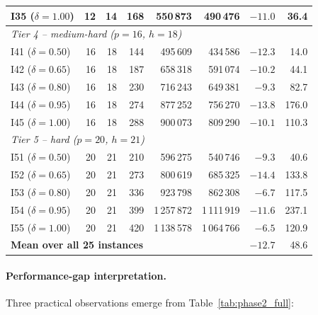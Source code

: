 \begin{table}[t]
{\begin{tabular}{@{}lrrrrrrr@{}}
I35 ($\delta=1.00$) & 12 & 14 & 168 & 550\,873 & 490\,476 & $-11.0$ &  36.4 \\
\midrule
\multicolumn{8}{l}{\emph{Tier 4 -- medium-hard ($p=16$, $h=18$)}} \\
I41 ($\delta=0.50$) & 16 & 18 & 144 & 495\,609 & 434\,586 & $-12.3$ &  14.0 \\
I42 ($\delta=0.65$) & 16 & 18 & 187 & 658\,318 & 591\,074 & $-10.2$ &  44.1 \\
I43 ($\delta=0.80$) & 16 & 18 & 230 & 716\,243 & 649\,381 &  $-9.3$ &  82.7 \\
I44 ($\delta=0.95$) & 16 & 18 & 274 & 877\,252 & 756\,270 & $-13.8$ & 176.0 \\
I45 ($\delta=1.00$) & 16 & 18 & 288 & 900\,073 & 809\,290 & $-10.1$ & 110.3 \\
\midrule
\multicolumn{8}{l}{\emph{Tier 5 -- hard ($p=20$, $h=21$)}} \\
I51 ($\delta=0.50$) & 20 & 21 & 210 &  596\,275 &  540\,746 &  $-9.3$ &  40.6 \\
I52 ($\delta=0.65$) & 20 & 21 & 273 &  800\,619 &  685\,325 & $-14.4$ & 133.8 \\
I53 ($\delta=0.80$) & 20 & 21 & 336 &  923\,798 &  862\,308 &  $-6.7$ & 117.5 \\
I54 ($\delta=0.95$) & 20 & 21 & 399 & 1\,257\,872 & 1\,111\,919 & $-11.6$ & 237.1 \\
I55 ($\delta=1.00$) & 20 & 21 & 420 & 1\,138\,578 & 1\,064\,766 &  $-6.5$ & 120.9 \\
\midrule
\multicolumn{5}{l}{\textbf{Mean over all 25 instances}} & & $-12.7$ & 48.6 \\
\bottomrule
\end{tabular}}
\end{table}

\paragraph{Performance-gap interpretation.}
Three practical observations emerge from Table~\ref{tab:phase2_full}:

